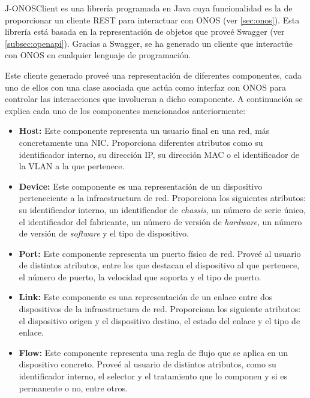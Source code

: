 J-ONOSClient\cite{onosjavadocbib} es una librería programada en Java cuya funcionalidad es la de proporcionar un cliente \ac{REST} para interactuar con \ac{ONOS} (ver \ref{sec:onos}). Esta librería está basada en la representación de objetos que proveé Swagger (ver \ref{subsec:openapi}). Gracias a Swagger, se ha generado un cliente que interactúe con \ac{ONOS} en cualquier lenguaje de programación.

Este cliente generado proveé una representación de diferentes componentes, cada uno de ellos con una clase asociada que actúa como interfaz con \ac{ONOS} para controlar las interacciones que involucran a dicho componente. A continuación se explica cada uno de los componentes mencionados anteriormente:

\begin{itemize}
	
	\item \textbf{Host:} Este componente representa un usuario final en una red, más concretamente una \ac{NIC}. Proporciona diferentes atributos como su identificador interno, su dirección \ac{IP}, su dirección \ac{MAC} o el identificador de la \ac{VLAN} a la que pertenece.
	
	\item \textbf{Device:} Este componente es una representación de un dispositivo perteneciente a la infraestructura de red. Proporciona los siguientes atributos: su identificador interno, un identificador de \textit{chassis}, un número de serie único, el identificador del fabricante, un número de versión de \textit{hardware}, un número de versión de \textit{software} y el tipo de dispositivo. 
	
	\item \textbf{Port:} Este componente representa un puerto físico de red. Proveé al usuario de distintos atributos, entre los que destacan el dispositivo al que pertenece, el número de puerto, la velocidad que soporta y el tipo de puerto.
	
	\item \textbf{Link:} Este componente es una representación de un enlace entre dos dispositivos de la infraestructura de red. Proporciona los siguiente atributos: el dispositivo origen y el dispositivo destino, el estado del enlace y el tipo de enlace.
	
	\item \textbf{Flow:} Este componente representa una regla de flujo que se aplica en un dispositivo concreto. Proveé al usuario de distintos atributos, como su identificador interno, el selector y el tratamiento que lo componen y si es permanente o no, entre otros.
	

\end{itemize}
